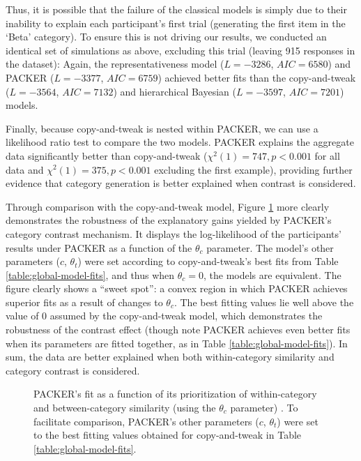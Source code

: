 \documentclass[12pt]{article}
\newcommand\inputpgf[2]{{
\let\pgfimageWithoutPath\pgfimage
\renewcommand{\pgfimage}[2][]{\pgfimageWithoutPath[##1]{#1/##2}}

}}
\begin{document}
\begin{flushleft}
Thus, it is possible that the failure of the classical models is simply due to
their inability to explain each participant's first trial (generating the first
item in the `Beta' category). To ensure this is not driving our results, we
conducted an identical set of simulations as above, excluding this trial
(leaving 915 responses in the dataset): Again, the representativeness model ($L
= -3286$, $AIC = 6580$) and PACKER ($L = -3377$,
$AIC = 6759$) achieved better fits than the copy-and-tweak ($L = -3564$,
$AIC = 7132$) and hierarchical Bayesian ($L = -3597$, $AIC = 7201$) models.

Finally, because copy-and-tweak is nested within PACKER, we can use a likelihood
ratio test to compare the two models. PACKER explains the aggregate data
significantly better than copy-and-tweak ($\chi^2(1) = 747, p < 0.001$ for all
data and $\chi^2(1) = 375, p < 0.001$ excluding the first example), providing
further evidence that category generation is better explained when contrast is
considered.

Through comparison with the copy-and-tweak model, Figure
\ref{fig:packer-loglike} more clearly demonstrates the robustness of the
explanatory gains yielded by PACKER's category contrast mechanism. It displays
the log-likelihood of the participants' results under PACKER as a function of
the $\theta_c$ parameter. The model's other parameters ($c$,
$\theta_t$) were set according to copy-and-tweak's best fits from Table
\ref{table:global-model-fits}, and thus when $\theta_c=0$, the models are
equivalent. The figure clearly shows a ``sweet spot'': a convex region in which
PACKER achieves superior fits as a result of changes to $\theta_c$. The
best fitting values lie well above the value of 0 assumed by the copy-and-tweak
model, which demonstrates the robustness of the contrast effect (though note
PACKER achieves even better fits when its parameters are fitted together, as in
Table \ref{table:global-model-fits}). In sum, the data are better explained when
both within-category similarity and category contrast is considered.

\begin{figure}
    \begin{center} \inputpgf{figs/}{packer-loglike.pgf}
      \caption{PACKER's fit as a function of its prioritization of
        within-category and between-category similarity (using the
        $\theta_c$ parameter) . To facilitate comparison, PACKER's other
        parameters ($c$, $\theta_t$) were set to the best fitting values
        obtained for copy-and-tweak in Table \ref{table:global-model-fits}. }
    \label{fig:packer-loglike}
    \end{center}
\end{figure}



\end{flushleft}
\end{document}
